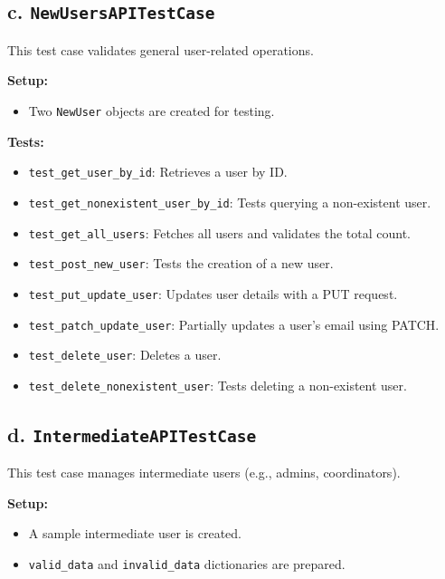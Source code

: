 \documentclass[12pt]{article}
\begin{document}
\subsection*{c. \texttt{NewUsersAPITestCase}}
This test case validates general user-related operations.

\textbf{Setup:}
\begin{itemize}
    \item Two \texttt{NewUser} objects are created for testing.
\end{itemize}

\textbf{Tests:}
\begin{itemize}
    \item \texttt{test\_get\_user\_by\_id}: Retrieves a user by ID.
    \item \texttt{test\_get\_nonexistent\_user\_by\_id}: Tests querying a non-existent user.
    \item \texttt{test\_get\_all\_users}: Fetches all users and validates the total count.
    \item \texttt{test\_post\_new\_user}: Tests the creation of a new user.
    \item \texttt{test\_put\_update\_user}: Updates user details with a PUT request.
    \item \texttt{test\_patch\_update\_user}: Partially updates a user's email using PATCH.
    \item \texttt{test\_delete\_user}: Deletes a user.
    \item \texttt{test\_delete\_nonexistent\_user}: Tests deleting a non-existent user.
\end{itemize}

\subsection*{d. \texttt{IntermediateAPITestCase}}
This test case manages intermediate users (e.g., admins, coordinators).

\textbf{Setup:}
\begin{itemize}
    \item A sample intermediate user is created.
    \item \texttt{valid\_data} and \texttt{invalid\_data} dictionaries are prepared.
\end{itemize}
\end{document}
